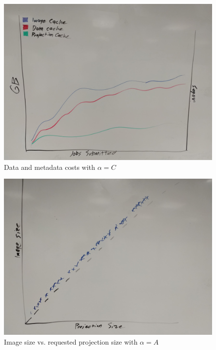 \documentclass[conference]{IEEEtran}
\begin{document}
\begin{figure}
\includegraphics[width=\linewidth]{plots/IMG_20181116_102111.jpg}
\caption{Data and metadata costs with $\alpha=C$}
\end{figure}

\begin{figure}
\includegraphics[width=\linewidth]{plots/IMG_20181116_102506.jpg}
\caption{Image size vs. requested projection size with $\alpha=A$}
\end{figure}
\end{document}
